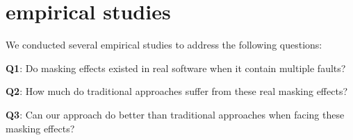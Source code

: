 \documentclass{sig-alternate}
\begin{document}
%
%

\section{empirical studies}
We conducted several empirical studies to address the following questions:

\textbf{Q1}: Do masking effects existed in real software when it contain multiple faults?

\textbf{Q2}: How much do traditional approaches suffer from these real masking effects?

\textbf{Q3}: Can our approach do better than traditional approaches when facing these masking effects?
%
\end{document}
